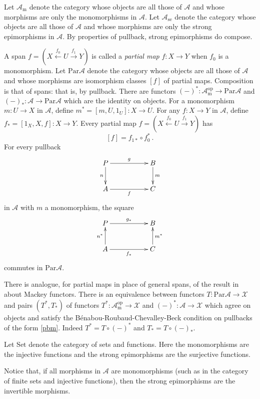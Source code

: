 \documentclass[a4paper,12pt,reqno]{amsart}
\theoremstyle{definition}
\theoremstyle{fact}
\theoremstyle{genquest}
\theoremstyle{step}
\newcommand{\lra}{\longrightarrow}
\newcommand{\lla}{\longleftarrow}
\def\CA{{\mathscr A}}
\def\CX{{\mathscr X}}
\begin{document}
Let $\CA_{\mathrm{m}}$ denote the category whose objects are all those of $\CA$
and whose morphisms are only the monomorphisms in $\CA$.
Let $\CA_{\mathrm{se}}$ denote the category whose objects are all those of $\CA$
and whose morphisms are only the strong epimorphisms in $\CA$. 
By properties of pullback, strong epimorphisms do compose.

A span $f = (X\stackrel{f_0}\lla U \stackrel{f_1}\lra Y)$ is called a {\em partial map}
$f : X\lra Y$ when $f_0$ is a monomorphism. Let $\mathrm{Par}\CA$ 
denote the category
whose objects are all those of $\CA$ and whose morphisms are isomorphism
classes $[f]$ of partial maps. Composition is that of spans: that is, by pullback.
There are functors $(-)^* : \CA_{\mathrm{m}}^{\mathrm{op}} \lra \mathrm{Par}\CA$
and $(-)_* : \CA \lra \mathrm{Par}\CA$ which are the identity on objects.
For a monomorphism $m:U\lra X$ in $\CA$, define $m^*= [m,U,1_U] : X\lra U$.
For any $f: X \lra Y$ in $\CA$, define $f_*=[1_X,X,f] : X \lra Y$.
Every partial map $f = (X\stackrel{f_0}\lla U \stackrel{f_1}\lra Y)$ has $$[f] = f_{1*}\circ f_0^* \ .$$ 
For every pullback
\begin{equation}\label{pbm}
\xymatrix{
P \ar[rr]^-{g} \ar[d]_-{n} && B \ar[d]^-{m} \\
A \ar[rr]_-{f} && C}
\end{equation}
in $\CA$ with $m$ a monomorphism, the square
\begin{equation}
\xymatrix{
P \ar[rr]^-{g_*}  && B  \\
A \ar[rr]_-{f_*} \ar[u]^-{n^*} && C \ar[u]_-{m^*}}
\end{equation}
commutes in $\mathrm{Par}\CA$. 

There is analogue, for partial maps in place of general spans, of the result in
\cite{Lindner1976} about Mackey functors.
There is an equivalence between functors $T : \mathrm{Par}\CA \lra \CX$
and pairs $(T^*,T_*)$ of functors 
$T^* : \CA_{\mathrm{m}}^{\mathrm{op}} \lra \CX$
and $(-)^* : \CA \lra \CX$
which agree on objects and satisfy the B\'enabou-Roubaud-Chevalley-Beck condition on pullbacks of the form \eqref{pbm}. 
Indeed $T^*=T\circ (-)^*$ and $T_*=T\circ (-)_*$. 

Let $\mathrm{Set}$ denote the category of sets and functions. 
Here the monomorphisms are the injective functions and the strong epimorphisms are the surjective functions.

Notice that, if all morphisms in $\CA$ are monomorphisms (such as in the
category of finite sets and injective functions), then the strong epimorphisms
are the invertible morphisms.
\end{document}
